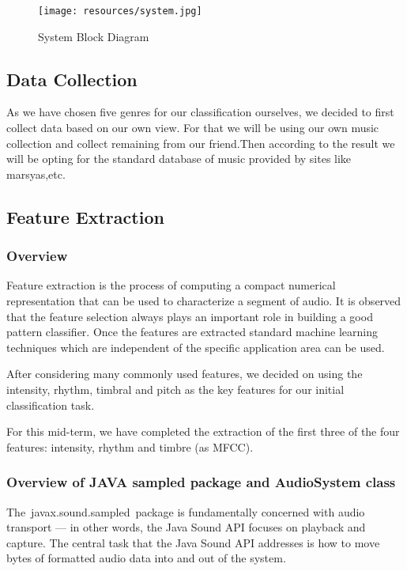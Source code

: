 \begin{figure}[h!]
        \centering
        \texttt{[image: resources/system.jpg]}
        \caption{System Block Diagram}
        \label{fig:figure2}
\end{figure}

\subsection{Data Collection}
As we have chosen five genres for our classification ourselves, we decided to first collect data based on our own view. For that we will be using our
own music collection and collect remaining from our friend.Then according to the result we will be opting for the standard database of music provided
by sites like marsyas,etc.

\subsection{Feature Extraction}

\subsubsection{Overview}
Feature extraction is the process of computing a compact numerical representation that can be used to characterize a segment of audio. It is observed
that the feature selection always plays an important role in building a good pattern classifier. Once the features are extracted standard machine learning
techniques which are independent of the specific application area can be used. 
\par  After considering many commonly used features, we decided on using the intensity, rhythm, timbral and pitch as the key features for our initial
classification task. 
\par For this mid-term, we have completed the extraction of the first three of the four features: intensity, rhythm and timbre (as MFCC). 

\subsubsection{Overview of JAVA sampled package and AudioSystem class}

The javax.sound.sampled package is fundamentally concerned with audio transport — in other words, the Java Sound API focuses on playback and capture. The
central task that the Java Sound API addresses is how to move bytes of formatted audio data into and out of the system. 

